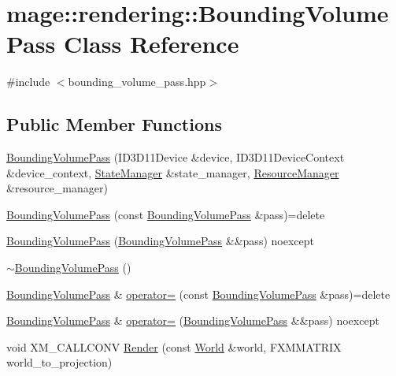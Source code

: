 \hypertarget{classmage_1_1rendering_1_1_bounding_volume_pass}{}\section{mage\+:\+:rendering\+:\+:Bounding\+Volume\+Pass Class Reference}
\label{classmage_1_1rendering_1_1_bounding_volume_pass}


{\ttfamily \#include $<$bounding\+\_\+volume\+\_\+pass.\+hpp$>$}

\subsection*{Public Member Functions}
\begin{DoxyCompactItemize}
\item 
\mbox{\hyperlink{classmage_1_1rendering_1_1_bounding_volume_pass_ac612308d7f54297f2357b0071699979d}{Bounding\+Volume\+Pass}} (I\+D3\+D11\+Device \&device, I\+D3\+D11\+Device\+Context \&device\+\_\+context, \mbox{\hyperlink{classmage_1_1rendering_1_1_state_manager}{State\+Manager}} \&state\+\_\+manager, \mbox{\hyperlink{classmage_1_1rendering_1_1_resource_manager}{Resource\+Manager}} \&resource\+\_\+manager)
\item 
\mbox{\hyperlink{classmage_1_1rendering_1_1_bounding_volume_pass_a038625bc0d88f87debee24f888c5e8a5}{Bounding\+Volume\+Pass}} (const \mbox{\hyperlink{classmage_1_1rendering_1_1_bounding_volume_pass}{Bounding\+Volume\+Pass}} \&pass)=delete
\item 
\mbox{\hyperlink{classmage_1_1rendering_1_1_bounding_volume_pass_a16f91c871dabbf6904606abad24d551f}{Bounding\+Volume\+Pass}} (\mbox{\hyperlink{classmage_1_1rendering_1_1_bounding_volume_pass}{Bounding\+Volume\+Pass}} \&\&pass) noexcept
\item 
\mbox{\hyperlink{classmage_1_1rendering_1_1_bounding_volume_pass_a6a70806bfad252e2a6409c94a0de7da7}{$\sim$\+Bounding\+Volume\+Pass}} ()
\item 
\mbox{\hyperlink{classmage_1_1rendering_1_1_bounding_volume_pass}{Bounding\+Volume\+Pass}} \& \mbox{\hyperlink{classmage_1_1rendering_1_1_bounding_volume_pass_af6651287f16a21d755c8e304f4997fcf}{operator=}} (const \mbox{\hyperlink{classmage_1_1rendering_1_1_bounding_volume_pass}{Bounding\+Volume\+Pass}} \&pass)=delete
\item 
\mbox{\hyperlink{classmage_1_1rendering_1_1_bounding_volume_pass}{Bounding\+Volume\+Pass}} \& \mbox{\hyperlink{classmage_1_1rendering_1_1_bounding_volume_pass_a39c5dffd1a1381672e3dbc14eb07c8cf}{operator=}} (\mbox{\hyperlink{classmage_1_1rendering_1_1_bounding_volume_pass}{Bounding\+Volume\+Pass}} \&\&pass) noexcept
\item 
void X\+M\+\_\+\+C\+A\+L\+L\+C\+O\+NV \mbox{\hyperlink{classmage_1_1rendering_1_1_bounding_volume_pass_af3b780430cc6e79f21e64a2fc037a1e1}{Render}} (const \mbox{\hyperlink{classmage_1_1rendering_1_1_world}{World}} \&world, F\+X\+M\+M\+A\+T\+R\+IX world\+\_\+to\+\_\+projection)
\end{DoxyCompactItemize}
